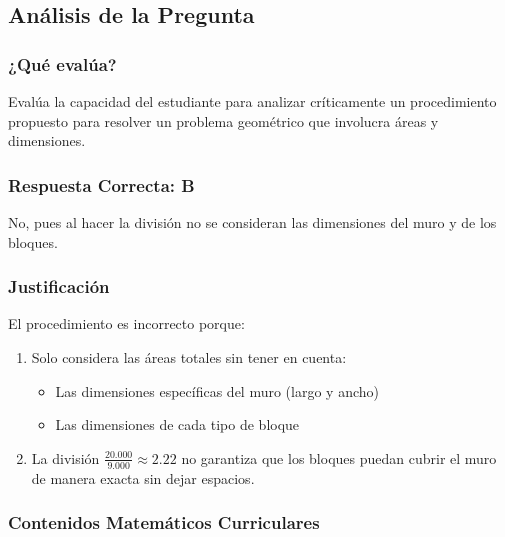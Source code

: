 \documentclass[
]{article}
\providecommand{\tightlist}{%
  \setlength{\itemsep}{0pt}\setlength{\parskip}{0pt}}
\begin{document}
\subsection{Análisis de la Pregunta}\label{anuxe1lisis-de-la-pregunta}

\subsubsection{¿Qué evalúa?}\label{quuxe9-evaluxfaa-3}

Evalúa la capacidad del estudiante para analizar críticamente un
procedimiento propuesto para resolver un problema geométrico que
involucra áreas y dimensiones.

\subsubsection{Respuesta Correcta: B}\label{respuesta-correcta-b}

No, pues al hacer la división no se consideran las dimensiones del muro
y de los bloques.

\subsubsection{Justificación}\label{justificaciuxf3n-5}

El procedimiento es incorrecto porque:

\begin{enumerate}
\def\labelenumi{\arabic{enumi}.}
\tightlist
\item
  Solo considera las áreas totales sin tener en cuenta:

  \begin{itemize}
  \tightlist
  \item
    Las dimensiones específicas del muro (largo y ancho)
  \item
    Las dimensiones de cada tipo de bloque
  \end{itemize}
\item
  La división \(\frac{20.000}{9.000} \approx 2.22\) no garantiza que los
  bloques puedan cubrir el muro de manera exacta sin dejar espacios.
\end{enumerate}

\subsubsection{Contenidos Matemáticos
Curriculares}\label{contenidos-matemuxe1ticos-curriculares-4}
\end{document}
